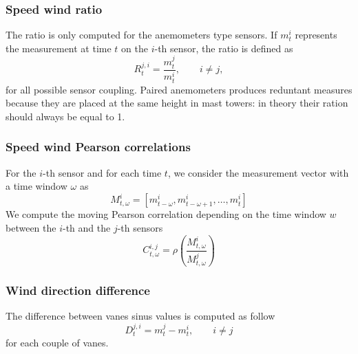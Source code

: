 \documentclass[conference]{IEEEtran}
\begin{document}
\subsubsection{Speed wind ratio}
The ratio is only computed for the anemometers type sensors. If $m_t^{i}$ represents the measurement at time $t$ on the $i$-th sensor, the ratio is defined as
\begin{equation}
R_{t}^{j,i} = \frac{m_{t}^{j}}{m_{t}^{i}},\qquad i \neq j,
\end{equation} 
for all possible sensor coupling. Paired anemometers produces reduntant measures because they are placed at the same  height in mast towers: in theory their ration should always be equal to 1.

\subsubsection{Speed wind Pearson correlations}
For the $i$-th sensor and for each time $t$, we consider the measurement vector with a time window $\omega$ as 
\begin{equation}
M^i_{t,\omega} = [m_{t-\omega}^i,m_{t-\omega+1}^i,\ldots,m_t^i]
\end{equation}
We compute the moving Pearson correlation depending on the time window $w$ between the $i$-th and the $j$-th sensors
\begin{equation}
C^{i,j}_{t,\omega}= \rho\left( \frac{M^i_{t,\omega}}{M^j_{t,\omega}}\right)
\end{equation}

\subsubsection{Wind direction difference}
The difference between vanes sinus values is computed as follow
\begin{equation}
D_{t}^{j,i} = {m_{t}^{j} - m_{t}^{i}},\qquad i \neq j 
\end{equation} 
for each couple of vanes.
\end{document}
